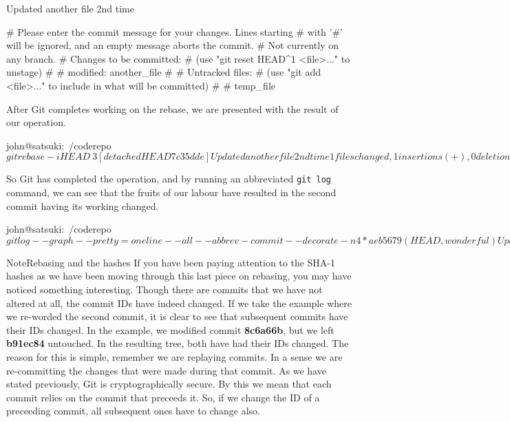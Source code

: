 \begin{code}
Updated another file 2nd time

# Please enter the commit message for your changes. Lines starting
# with '#' will be ignored, and an empty message aborts the commit.
# Not currently on any branch.
# Changes to be committed:
#   (use "git reset HEAD^1 <file>..." to unstage)
#
#       modified:   another_file
#
# Untracked files:
#   (use "git add <file>..." to include in what will be committed)
#
#       temp_file
\end{code}

After Git completes working on the rebase, we are presented with the result of our operation.

\begin{code}
john@satsuki:~/coderepo$ git rebase -i HEAD~3
[detached HEAD 7c35dde] Updated another file 2nd time
 1 files changed, 1 insertions(+), 0 deletions(-)
Successfully rebased and updated refs/heads/wonderful.
john@satsuki:~/coderepo$
\end{code}

So Git has completed the operation, and by running an abbreviated \texttt{git log} command, we can see that the fruits of our labour have resulted in the second commit having its working changed.

\begin{code}
john@satsuki:~/coderepo$ git log --graph --pretty=oneline --all --abbrev-commit --decorate -n 4
* aeb5679 (HEAD, wonderful) Updated another file again
* 7c35dde Updated another file 2nd time
* c0e2f5b Updated another file
* 1c3206a (master) Added a new file
john@satsuki:~/coderepo$
\end{code}

\begin{callout}{Note}{Rebasing and the hashes}
If you have been paying attention to the SHA-1 hashes as we have been moving through this last piece on rebasing, you may have noticed something interesting.
Though there are commits that we have not altered at all, the commit IDs have indeed changed.
If we take the example where we re-worded the second commit, it is clear to see that subsequent commits have their IDs changed.
In the example, we modified commit \textbf{8c6a66b}, but we left \textbf{b91ec84} untouched.
In the resulting tree, both have had their IDs changed.
\newline
\newline
The reason for this is simple, remember we are replaying commits.
In a sense we are re-committing the changes that were made during that commit.
As we have stated previously, Git is cryptographically secure.
By this we mean that each commit relies on the commit that preceeds it.
So, if we change the ID of a preceeding commit, all subsequent ones have to change also.
\end{callout}

